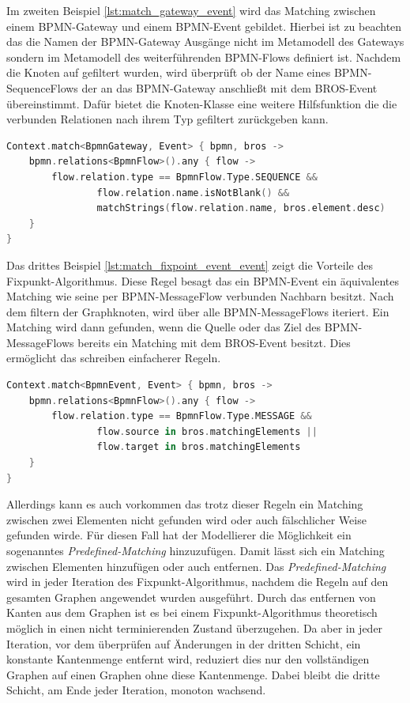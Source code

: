 Im zweiten Beispiel \cref{lst:match_gateway_event} wird das Matching zwischen einem BPMN-Gateway und einem BPMN-Event gebildet.
Hierbei ist zu beachten das die Namen der BPMN-Gateway Ausgänge nicht im Metamodell des Gateways sondern im Metamodell des weiterführenden BPMN-Flows definiert ist.
Nachdem die Knoten auf gefiltert wurden, wird überprüft ob der Name eines BPMN-SequenceFlows der an das BPMN-Gateway anschließt mit dem BROS-Event übereinstimmt.
Dafür bietet die Knoten-Klasse eine weitere Hilfsfunktion die die verbunden Relationen nach ihrem Typ gefiltert zurückgeben kann.

\begin{lstlisting}[language=Kotlin, caption=Matching Regel von einem BPMN-Gateway und einem BROS-Event, label=lst:match_gateway_event]
Context.match<BpmnGateway, Event> { bpmn, bros ->
    bpmn.relations<BpmnFlow>().any { flow ->
        flow.relation.type == BpmnFlow.Type.SEQUENCE &&
                flow.relation.name.isNotBlank() &&
                matchStrings(flow.relation.name, bros.element.desc)
    }
}
\end{lstlisting}

Das drittes Beispiel \cref{lst:match_fixpoint_event_event} zeigt die Vorteile des Fixpunkt-Algorithmus.
Diese Regel besagt das ein BPMN-Event ein äquivalentes Matching wie seine per BPMN-MessageFlow verbunden Nachbarn besitzt.
Nach dem filtern der Graphknoten, wird über alle BPMN-MessageFlows iteriert.
Ein Matching wird dann gefunden, wenn die Quelle oder das Ziel des BPMN-MessageFlows bereits ein Matching mit dem BROS-Event besitzt.
Dies ermöglicht das schreiben einfacherer Regeln.

\begin{lstlisting}[language=Kotlin, caption=Fixpunkt Matching Regel von einem BPMN-BpmnEvent und einem BROS-Event, label=lst:match_fixpoint_event_event]
Context.match<BpmnEvent, Event> { bpmn, bros ->
    bpmn.relations<BpmnFlow>().any { flow ->
        flow.relation.type == BpmnFlow.Type.MESSAGE &&
                flow.source in bros.matchingElements ||
                flow.target in bros.matchingElements
    }
}
\end{lstlisting}

Allerdings kann es auch vorkommen das trotz dieser Regeln ein Matching zwischen zwei Elementen nicht gefunden wird oder auch fälschlicher Weise gefunden wirde.
Für diesen Fall hat der Modellierer die Möglichkeit ein sogenanntes \emph{Predefined-Matching} hinzuzufügen.
Damit lässt sich ein Matching zwischen Elementen hinzufügen oder auch entfernen.
Das \emph{Predefined-Matching} wird in jeder Iteration des Fixpunkt-Algorithmus, nachdem die Regeln auf den gesamten Graphen angewendet wurden ausgeführt.
Durch das entfernen von Kanten aus dem Graphen ist es bei einem Fixpunkt-Algorithmus theoretisch möglich in einen nicht terminierenden Zustand überzugehen.
Da aber in jeder Iteration, vor dem überprüfen auf Änderungen in der dritten Schicht, ein konstante Kantenmenge entfernt wird, reduziert dies nur den vollständigen Graphen auf einen Graphen ohne diese Kantenmenge.
Dabei bleibt die dritte Schicht, am Ende jeder Iteration, monoton wachsend. 

